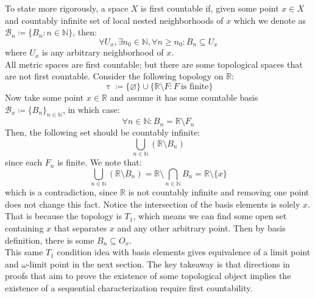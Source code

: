 \documentclass[10pt,letterpaper]{article} %
\begin{document}
To state more rigorously, a space $X$ is first countable if, given some point $x \in X$ and countably infinite set of local nested neighborhoods of $x$ which we denote as $\mathcal{B}_n \coloneq \{B_n : n \in \mathbb{N}\}$, then:
\begin{equation*}
\forall U_x, \exists n_0 \in \mathbb{N}, \forall n \geqslant n_0: B_n \subseteq U_x
\end{equation*}
where $U_x$ is any arbitrary neighborhood of $x$.\\

All metric spaces are first countable; but there are some topological spaces that are not first countable. Consider the following topology on $\mathbb{R}$:
\begin{equation*}
\uptau \coloneq \{\varnothing\} \cup \{\mathbb{R} \setminus F: F \ \text{is finite}\}
\end{equation*}
Now take some point $x \in \mathbb{R}$ and assume it has some countable basis $\mathcal{B}_x \coloneq \{B_n\}_{n \in \mathbb{N}}$, in which case:
\begin{equation*}
\forall n \in \mathbb{N}: B_n = \mathbb{R}\setminus F_n
\end{equation*}
Then, the following set should be countably infinite:
\begin{equation*}
\bigcup_{n \in \mathbb{N}}(\mathbb{R}\setminus B_n)
\end{equation*}
since each $F_n$ is finite. We note that:
\begin{equation*}
\bigcup_{n \in \mathbb{N}}(\mathbb{R}\setminus B_n) = \mathbb{R} \setminus \bigcap_{n \in \mathbb{N}} B_n = \mathbb{R}\setminus \{x\}    
\end{equation*}
which is a contradiction, since $\mathbb{R}$ is not countably infinite and removing one point does not change this fact. Notice the intersection of the basis elements is solely $x$. That is because the topology is $T_1$, which means we can find some open set containing $x$ that separates $x$ and any other arbitrary point. Then by basis definition, there is some $B_n \subseteq O_x$.\\

This same $T_1$ condition idea with basis elements gives equivalence of a limit point and $\omega$-limit point in the next section. The key takeaway is that directions in proofs that aim to prove the existence of some topological object implies the existence of a sequential characterization require first countability.\\
\end{document}
